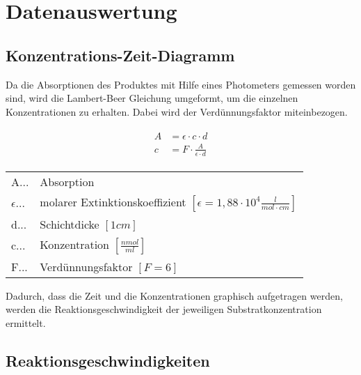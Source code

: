 \newpage
\section{Datenauswertung}

\subsection{Konzentrations-Zeit-Diagramm}

Da die Absorptionen des Produktes mit Hilfe eines Photometers gemessen worden sind, wird die Lambert-Beer Gleichung umgeformt, um die einzelnen Konzentrationen zu erhalten. Dabei wird der Verdünnungsfaktor miteinbezogen. 

\begin{align}
  \begin{split}  
    A &= \epsilon \cdot c \cdot d \\
    c &= F \cdot \frac{A}{\epsilon \cdot d}
  \end{split}
\end{align}

\begin{table}[H]
  \begin{tabular}{ll}
    A...& Absorption \\
    $\epsilon$... & molarer Extinktionskoeffizient $[\epsilon = 1,88 \cdot 10^4 \frac{l}{mol \cdot cm}]$ \\
    d... & Schichtdicke $[1cm]$ \\
    c... & Konzentration $[\frac{nmol}{ml}]$ \\
    F... & Verdünnungsfaktor $[F = 6]$
  \end{tabular}
\end{table}

Dadurch, dass die Zeit und die Konzentrationen graphisch aufgetragen werden, werden die Reaktionsgeschwindigkeit der jeweiligen Substratkonzentration ermittelt.


\subsection{Reaktionsgeschwindigkeiten}

